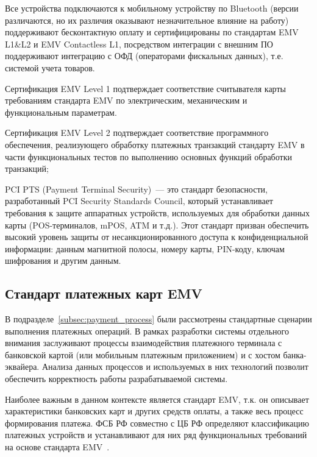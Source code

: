 
Все устройства подключаются к мобильному устройству по Bluetooth (версии различаются, но их различия оказывают незначительное влияние на работу) поддерживают бесконтактную оплату и сертифицированы по стандартам EMV L1\&L2 и EMV Contactless L1, посредством интеграции с внешним ПО поддерживают интеграцию с ОФД (операторами фискальных данных), т.е. системой учета товаров.

Сертификация EMV Level 1 подтверждает соответствие считывателя карты требованиям стандарта EMV по электрическим, механическим и функциональным параметрам.

Сертификация EMV Level 2 подтверждает соответствие программного обеспечения, реализующего обработку платежных транзакций стандарту EMV в части функциональных тестов по выполнению основных функций обработки транзакций;

PCI PTS (Payment Terminal Security)~--- это стандарт безопасности, разработанный PCI Security Standards Council, который устанавливает требования к защите аппаратных устройств, используемых для обработки данных карты (POS-терминалов, mPOS, ATM и т.д.).
Этот стандарт призван обеспечить высокий уровень защиты от несанкционированного доступа к конфиденциальной информации: данным магнитной полосы, номеру карты, PIN-коду, ключам шифрования и другим данным.


\subsection{Стандарт платежных карт EMV}

В подразделе~\ref{subsec:payment_process} были рассмотрены стандартные сценарии выполнения платежных операций.
В рамках разработки системы отдельного внимания заслуживают процессы взаимодействия платежного терминала с банковской картой (или мобильным платежным приложением) и с хостом банка-эквайера.
Анализа данных процессов и используемых в них технологий позволит обеспечить корректность работы разрабатываемой системы.

Наиболее важным в данном контексте является стандарт EMV, т.к. он описывает характеристики банковских карт и других средств оплаты, а также весь процесс формирования платежа.
ФСБ РФ совместно с ЦБ РФ определяют классификацию платежных устройств и устанавливают для них ряд функциональных требований на основе стандарта EMV~\cite{cbr_requirements}.


